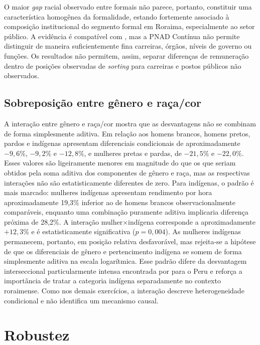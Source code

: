 \documentclass[12pt,a4paper]{article}
\begin{document}
O maior \textit{gap} racial observado entre formais não parece, portanto,
constituir uma característica homogênea da formalidade, estando fortemente
associado à composição institucional do segmento formal em Roraima,
especialmente ao setor público. A evidência é compatível com \citet{gerard2021},
mas a PNAD Contínua não permite distinguir de maneira suficientemente fina
carreiras, órgãos, níveis de governo ou funções. Os resultados não permitem,
assim, separar diferenças de remuneração dentro de posições observadas de
\textit{sorting} para carreiras e postos públicos não observados.

\subsection{Sobreposição entre gênero e raça/cor}
\label{subsec:interseccionalidade}

A interação entre gênero e raça/cor mostra que as desvantagens não se combinam
de forma simplesmente aditiva. Em relação aos homens brancos, homens pretos,
pardos e indígenas apresentam diferenciais condicionais de aproximadamente
$-9,6\%$, $-9,2\%$ e $-12,8\%$, e mulheres pretas e pardas, de $-21,5\%$ e
$-22,0\%$. Esses valores são ligeiramente menores em magnitude do que os que
seriam obtidos pela soma aditiva dos componentes de gênero e raça, mas as
respectivas interações não são estatisticamente diferentes de zero. Para
indígenas, o padrão é mais marcado: mulheres indígenas apresentam rendimento por
hora aproximadamente 19,3\% inferior ao de homens brancos observacionalmente
comparáveis, enquanto uma combinação puramente aditiva implicaria diferença
próxima de 28,2\%. A interação mulher$\times$indígena corresponde a
aproximadamente $+12,3\%$ e é estatisticamente significativa ($p=0,004$). As
mulheres indígenas permanecem, portanto, em posição relativa desfavorável, mas
rejeita-se a hipótese de que os diferenciais de gênero e pertencimento indígena
se somem de forma simplesmente aditiva na escala logarítmica. Esse padrão difere
da desvantagem interseccional particularmente intensa encontrada por
\citet{kolev2015} para o Peru e reforça a importância de tratar a categoria
indígena separadamente no contexto roraimense. Como nos demais exercícios, a
interação descreve heterogeneidade condicional e não identifica um mecanismo
causal.

\section{Robustez}
\label{sec:robustez}
\end{document}
